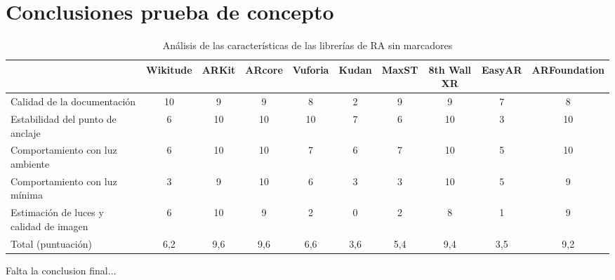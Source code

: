 \section{Conclusiones prueba de concepto}
\begin{table}[H]
\resizebox{\textwidth}{!} {
    \centering
    \begin{tabular}{|m{3cm}|c|c|c|c|c|c|c|c|c|}
    \hline
    &Wikitude&	ARKit &	ARcore & Vuforia & Kudan &	MaxST  & 8th Wall XR & EasyAR & ARFoundation\\
     \hline
         Calidad de la documentación 	& 10 & 9 & 9 & 8 &2 & 9 & 9 &  7 & 8 \\
  \hline
Estabilidad del punto de anclaje 		& 6 & 10 & 10 & 10 & 7 & 6 &  10  & 3 & 10 \\
 \hline
Comportamiento con luz ambiente   & 6 & 10 & 10& 7 & 6 & 7 & 10  & 5 & 10\\
 \hline
Comportamiento con luz mínima     & 3 &  9 & 10 & 6 & 3 & 3& 10 & 5 & 9\\
 \hline
Estimación de luces y calidad de imagen & 6 & 10 & 9 & 2  & 0  & 2 & 8 & 1 &9\\
 \hline
Total (puntuación) & 6,2 & 9,6 & 9,6  & 6,6 &    3,6   &   5,4     &  9,4     &     3,5        &  9,2          \\
\hline
    \end{tabular}
}
    \caption{Análisis de las características de las librerías de RA sin marcadores}
    \label{tab:my_label}
\end{table}
Falta la conclusion final...
\noindent